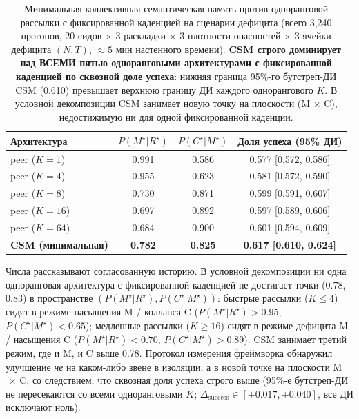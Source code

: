 \documentclass{article}
\begin{document}
\begin{table}[ht]
\caption{Минимальная коллективная семантическая память против одноранговой рассылки с фиксированной каденцией на сценарии дефицита (всего 3{,}240 прогонов, 20 сидов $\times$ 3 раскладки $\times$ 3 плотности опасностей $\times$ 3 ячейки дефицита $(N,T)$, $\approx 5$ мин настенного времени). \textbf{CSM строго доминирует над ВСЕМИ пятью одноранговыми архитектурами с фиксированной каденцией по сквозной доле успеха}: нижняя граница 95\%-го бутстреп-ДИ CSM (0.610) превышает верхнюю границу ДИ каждого однорангового $K$. В условной декомпозиции CSM занимает новую точку на плоскости (M$\,\times\,$C), недостижимую ни для одной фиксированной каденции.}
\label{tab:csm-results}
\centering
\small
\begin{tabular}{l c c c}
\toprule
Архитектура & $P(M^\star|R^\star)$ & $P(C^\star|M^\star)$ & Доля успеха (95\% ДИ) \\
\midrule
peer ($K{=}1$)  & 0.991 & 0.586 & 0.577 [0.572, 0.586] \\
peer ($K{=}4$)  & 0.955 & 0.623 & 0.581 [0.572, 0.590] \\
peer ($K{=}8$)  & 0.730 & 0.871 & 0.599 [0.591, 0.607] \\
peer ($K{=}16$) & 0.697 & 0.892 & 0.597 [0.589, 0.606] \\
peer ($K{=}64$) & 0.684 & 0.900 & 0.601 [0.594, 0.609] \\
\textbf{CSM (минимальная)} & \textbf{0.782} & \textbf{0.825} & \textbf{0.617 [0.610, 0.624]} \\
\bottomrule
\end{tabular}
\end{table}

Числа рассказывают согласованную историю. В условной декомпозиции ни одна одноранговая архитектура с фиксированной каденцией не достигает точки (0.78, 0.83) в пространстве $(P(M^\star|R^\star), P(C^\star|M^\star))$: быстрые рассылки ($K \le 4$) сидят в режиме насыщения M / коллапса C ($P(M^\star|R^\star) > 0.95$, $P(C^\star|M^\star) < 0.65$); медленные рассылки ($K \ge 16$) сидят в режиме дефицита M / насыщения C ($P(M^\star|R^\star) < 0.70$, $P(C^\star|M^\star) > 0.89$). CSM занимает третий режим, где и M, и C выше 0.78. Протокол измерения фреймворка обнаружил улучшение \emph{не} на каком-либо звене в изоляции, а в новой точке на плоскости M$\,\times\,$C, со следствием, что сквозная доля успеха строго выше (95\%-е бутстреп-ДИ не пересекаются со всеми одноранговыми $K$; $\Delta_{\mathrm{success}}\!\in\![+0.017, +0.040]$, все ДИ исключают ноль).
\end{document}
